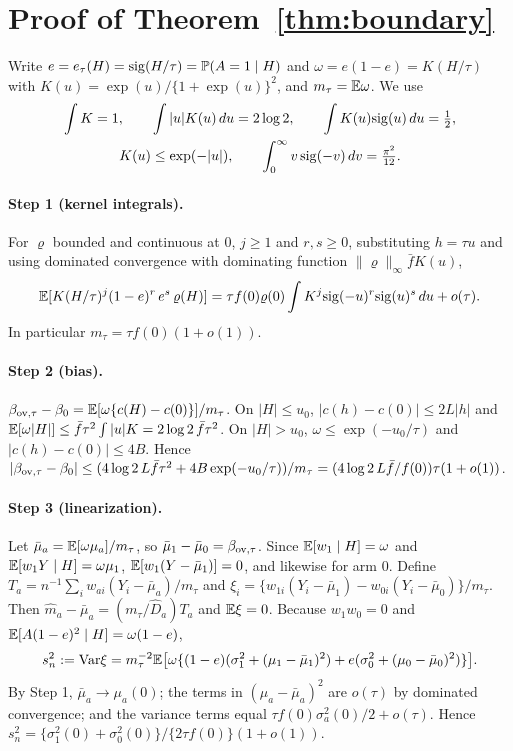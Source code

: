 
\section{Proof of Theorem~\ref{thm:boundary}}\label{app:boundary}

Write $e=e_\tau(H)=\mathrm{sig}(H/\tau)=\mathbb{P}(A=1\mid H)$ and $\omega=e(1-e)=K(H/\tau)$ with $K(u)=\exp(u)/\{1+\exp(u)\}^2$,
and $m_\tau=\mathbb{E}\omega$. We use
\begin{gather*}
\int K=1,\qquad \int|u|K(u)\,du=2\log2,\qquad \int K(u)\mathrm{sig}(u)\,du=\tfrac12,\\
K(u)\le \exp(-|u|),\qquad \int_0^\infty v\,\mathrm{sig}(-v)\,dv=\tfrac{\pi^2}{12}.
\end{gather*}

\paragraph{Step 1 (kernel integrals).} For $\varrho$ bounded and continuous at $0$,
$j\ge1$ and $r,s\ge0$, substituting $h=\tau u$ and using dominated convergence
with dominating function $\|\varrho\|_\infty\bar fK(u)$,
\[
\mathbb{E}[K(H/\tau)^j(1-e)^r\,e^s\,\varrho(H)]=\tau f(0)\varrho(0)\int K^j\mathrm{sig}(-u)^r\mathrm{sig}(u)^s\,du+o(\tau).
\]
In particular $m_\tau=\tau f(0)(1+o(1))$.

\paragraph{Step 2 (bias).} $\beta_{\mathrm{ov},\tau}-\beta_0=\mathbb{E}[\omega\{c(H)-c(0)\}]/m_\tau$.
On $|H|\le u_0$, $|c(h)-c(0)|\le2L|h|$ and
$\mathbb{E}[\omega|H|]\le\bar f\tau^2\int|u|K=2\log2\,\bar f\tau^2$. On $|H|>u_0$,
$\omega\le \exp(-u_0/\tau)$ and $|c(h)-c(0)|\le4B$. Hence
$|\beta_{\mathrm{ov},\tau}-\beta_0|\le(4\log2\,L\bar f\tau^2+4B\exp(-u_0/\tau))/m_\tau
=(4\log2\,L\bar f/f(0))\tau(1+o(1))$.

\paragraph{Step 3 (linearization).} Let $\bar\mu_a=\mathbb{E}[\omega\mu_a]/m_\tau$, so
$\bar\mu_1-\bar\mu_0=\beta_{\mathrm{ov},\tau}$. Since $\mathbb{E}[w_1\mid H]=\omega$ and
$\mathbb{E}[w_1Y\mid H]=\omega\mu_1$, $\mathbb{E}[w_1(Y-\bar\mu_1)]=0$, and likewise for arm
$0$. Define $T_a=n^{-1}\sum_iw_{ai}(Y_i-\bar\mu_a)/m_\tau$ and
$\xi_i=\{w_{1i}(Y_i-\bar\mu_1)-w_{0i}(Y_i-\bar\mu_0)\}/m_\tau$. Then
$\hat m_a-\bar\mu_a=(m_\tau/\hat D_a)T_a$ and $\mathbb{E}\xi=0$. Because $w_1w_0=0$ and
$\mathbb{E}[A(1-e)^2\mid H]=\omega(1-e)$,
\[
s_n^2:=\mathrm{Var}\xi=m_\tau^{-2}\mathbb{E}\big[\omega\{(1-e)(\sigma_1^2+(\mu_1-\bar\mu_1)^2)+e(\sigma_0^2+(\mu_0-\bar\mu_0)^2)\}\big].
\]
By Step 1, $\bar\mu_a\to\mu_a(0)$; the terms in $(\mu_a-\bar\mu_a)^2$ are
$o(\tau)$ by dominated convergence; and the variance terms equal
$\tau f(0)\sigma_a^2(0)/2+o(\tau)$. Hence
$s_n^2=\{\sigma_1^2(0)+\sigma_0^2(0)\}/\{2\tau f(0)\}(1+o(1))$.

